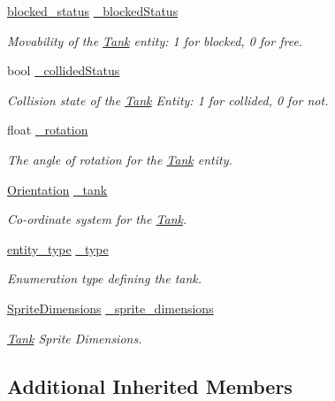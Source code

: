 \begin{DoxyCompactItemize}
\item 
\hyperlink{Structures_8h_a6fef29d9424addfa69bdd2a379424896}{blocked\-\_\-status} \hyperlink{classTank_a55423a404ce9c8b772462665769141a5}{\-\_\-blocked\-Status}
\begin{DoxyCompactList}\small\item\em Movability of the \hyperlink{classTank}{Tank} entity\-: 1 for blocked, 0 for free. \end{DoxyCompactList}\item 
bool \hyperlink{classTank_af2526be40c377df7652b5d7c314c7861}{\-\_\-collided\-Status}
\begin{DoxyCompactList}\small\item\em Collision state of the \hyperlink{classTank}{Tank} Entity\-: 1 for collided, 0 for not. \end{DoxyCompactList}\item 
float \hyperlink{classTank_a2fe3c5fe01a1faadae727c6a667b7cc9}{\-\_\-rotation}
\begin{DoxyCompactList}\small\item\em The angle of rotation for the \hyperlink{classTank}{Tank} entity. \end{DoxyCompactList}\item 
\hyperlink{classOrientation}{Orientation} \hyperlink{classTank_ab54320f716bcac8aa4073aab09fc958b}{\-\_\-tank}
\begin{DoxyCompactList}\small\item\em Co-\/ordinate system for the \hyperlink{classTank}{Tank}. \end{DoxyCompactList}\item 
\hyperlink{Structures_8h_a6d8f83e710b27d4f86c45f0bb77066e3}{entity\-\_\-type} \hyperlink{classTank_a3758229ef9d41d069e6128b17d414204}{\-\_\-type}
\begin{DoxyCompactList}\small\item\em Enumeration type defining the tank. \end{DoxyCompactList}\item 
\hyperlink{classSpriteDimensions}{Sprite\-Dimensions} \hyperlink{classTank_ae63c3e90ba5e3f9a3bfb8172865716fb}{\-\_\-sprite\-\_\-dimensions}
\begin{DoxyCompactList}\small\item\em \hyperlink{classTank}{Tank} Sprite Dimensions. \end{DoxyCompactList}\end{DoxyCompactItemize}
\subsection*{Additional Inherited Members}


